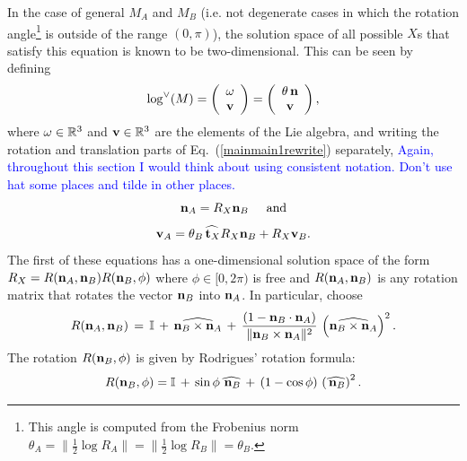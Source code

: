 \documentclass[twocolumn,10pt]{asme2ej}
\newcommand{\II}{\mathbb{I}}
\newcommand{\half}{\frac{1}{2}}
\begin{document}
In the case of general $M_A$ and $M_B$ (i.e. not degenerate cases in which the rotation angle\footnote{This angle is computed from the Frobenius norm $\theta_A =\|\half \log R_A\| = \|\half \log R_B\|= \theta_B$.} is outside of the range
$(0,\pi)$), the solution space of all possible $X$s that satisfy this equation is known to be two-dimensional.
This can be seen by defining
$$ \log^{\vee}(M) = \left(\begin{array}{c}
\omega \\
{\bf v} \end{array} \right)
=\left(\begin{array}{c}
\theta \, {\bf n} \\
{\bf v} \end{array} \right), $$
where ${\bf \omega} \in \mathbb{R}^3$ and ${\bf v} \in \mathbb{R}^3$ are the elements of the Lie algebra, and writing the rotation and translation parts of Eq.~(\ref{mainmain1rewrite}) separately,
\textcolor{blue}{Again, throughout this section I would think about using consistent notation. Don't use hat some places and tilde in other places.}
\begin{equation}
{\bf n}_A = R_X {\bf n}_B \hspace{5mm}\mbox{and}
\label{nanb} \end{equation}
\begin{equation}
{\bf v}_A = \theta_B \widehat{\,{\bf t}_X} R_X {\bf n}_B + R_X {\bf v}_B.
\label{vavb} \end{equation}
The first of these equations has a one-dimensional solution space of the form
$R_X = R({\bf n}_A, {\bf n}_B) R({\bf n}_B, \phi)$ where $\phi \in [0,2\pi)$ is free and
$R({\bf n}_A, {\bf n}_B)$ is any rotation matrix that rotates the vector ${\bf n}_B$ into ${\bf n}_A$.
In particular, choose
\begin{equation}
R({\bf n}_A, {\bf n}_B)  \,=\,
\II \,+\, \widehat{{\bf n}_B \times {\bf n}_A}
\,+\, \frac{(1- {\bf n}_B \cdot {\bf n}_A)}{\|{\bf n}_B \times {\bf n}_A\|^2} \, \left(\widehat{{\bf n}_B \times {\bf n}_A}\right)^2.
\label{transab}
\end{equation}
The rotation $R({\bf n}_B, \phi)$ is given by Rodrigues' rotation formula:
$$ R({\bf n}_B, \phi) = \II \,+\, \sin \phi \, \widehat{\,{\bf n}_B} \,+\, (1-\cos \phi)\, \left(\widehat{\,{\bf n}_B}\right)^2. $$
\end{document}
